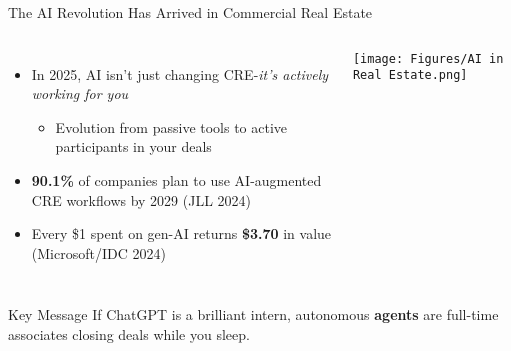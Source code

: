 \documentclass{beamer}
\begin{document}
\begin{frame}{The AI Revolution Has Arrived in Commercial Real Estate}
\small
  \begin{columns}[onlytextwidth]
  \hspace*{-.7cm}
      \begin{itemize}
        \item In 2025, AI isn’t just changing CRE-\emph{it’s actively working for you}
          \begin{itemize}
            \item Evolution from passive tools to active participants in your deals
          \end{itemize}
        \item \textbf{90.1\%} of companies plan to use AI-augmented CRE workflows by 2029 {\tiny(JLL 2024)} 
        \item Every \$1 spent on gen-AI returns \textbf{\$3.70} in value  {\tiny(Microsoft/IDC 2024)}
      \end{itemize}
    \hspace*{-1.3cm}
      \centering
      \texttt{[image: Figures/AI in Real Estate.png]}
  \end{columns}

  \vspace{-0.3cm}

  \begin{block}{Key Message}
    If ChatGPT is a brilliant intern, autonomous \textbf{agents} are full-time
    associates closing deals while you sleep.
  \end{block}
\end{frame}


\end{document}

